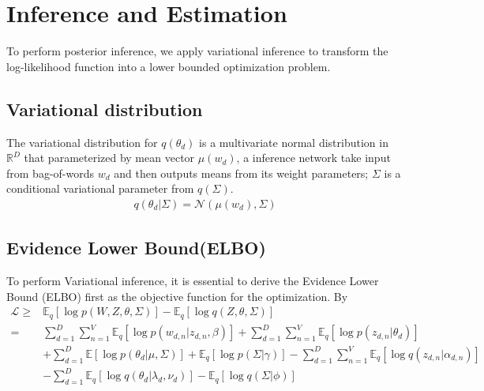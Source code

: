 \section{Inference and Estimation}
To perform posterior inference, we apply variational inference to transform the log-likelihood function into a lower bounded optimization problem.
\subsection{Variational distribution}
The variational distribution for $ q(\theta_d) $ is a multivariate normal distribution in $ \mathbb{R}^{D} $ that parameterized by mean vector $ \mu(w_d) $, a inference network take input from bag-of-words $ w_d $ and then outputs means from its weight parameters; $ \Sigma $ is a conditional variational parameter from $ q(\Sigma) $. 
\begin{align*}
q(\theta_d|\Sigma)=\mathcal{N}(\mu(w_d),\Sigma)
\end{align*}
\subsection{Evidence Lower Bound(ELBO)}\label{ch4:2} To perform Variational inference, it is essential to derive the Evidence Lower Bound (ELBO) first as the objective function for the optimization. By 
\begin{align}\label{eq:elbo_1}
\mathcal{L}\geq&\mathbb{E}_q[\log p(W,Z,\theta,\Sigma)]-\mathbb{E}_q[\log q(Z,\theta,\Sigma)]\\
=&\sum_{d=1}^{D}\sum_{n=1}^{V}\mathbb{E}_q[\log p(w_{d,n}|z_{d,n},\beta)]+\sum_{d=1}^{D}\sum_{n=1}^{V}\mathbb{E}_q[\log p(z_{d,n}|\theta_d)]\\
&+\sum_{d=1}^{D}\mathbb{E}[\log p(\theta_d|\mu,\Sigma)]+\mathbb{E}_q[\log p(\Sigma|\gamma)]-\sum_{d=1}^{D}\sum_{n=1}^{V}\mathbb{E}_q[\log q(z_{d,n}|\alpha_{d,n})]\\
&-\sum_{d=1}^{D}\mathbb{E}_q[\log q(\theta_d|\lambda_d,\nu_d)]-\mathbb{E}_q[\log q(\Sigma|\phi)]
\end{align}
